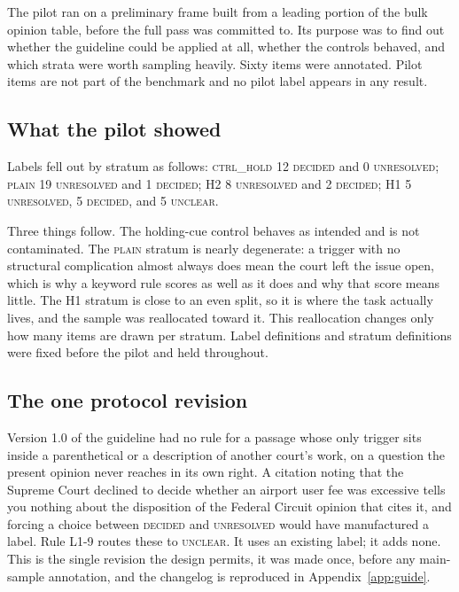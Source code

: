 The pilot ran on a preliminary frame built from a leading portion of the bulk
opinion table, before the full pass was committed to. Its purpose was to find
out whether the guideline could be applied at all, whether the controls behaved,
and which strata were worth sampling heavily. Sixty items were annotated. Pilot
items are not part of the benchmark and no pilot label appears in any result.

\subsection{What the pilot showed} Labels fell out by stratum as follows:
\textsc{ctrl\_hold} 12 \textsc{decided} and 0 \textsc{unresolved};
\textsc{plain} 19 \textsc{unresolved} and 1 \textsc{decided};
H2 8 \textsc{unresolved} and 2 \textsc{decided};
H1 5 \textsc{unresolved}, 5 \textsc{decided}, and 5 \textsc{unclear}.

Three things follow. The holding-cue control behaves as intended and is not
contaminated. The \textsc{plain} stratum is nearly degenerate: a trigger with no
structural complication almost always does mean the court left the issue open,
which is why a keyword rule scores as well as it does and why that score means
little. The H1 stratum is close to an even split, so it is where the task
actually lives, and the sample was reallocated toward it. This reallocation
changes only how many items are drawn per stratum. Label definitions and stratum
definitions were fixed before the pilot and held throughout.

\subsection{The one protocol revision} Version 1.0 of the guideline had no rule
for a passage whose only trigger sits inside a parenthetical or a description of
another court's work, on a question the present opinion never reaches in its own
right. A citation noting that the Supreme Court declined to decide whether an
airport user fee was excessive tells you nothing about the disposition of the
Federal Circuit opinion that cites it, and forcing a choice between
\textsc{decided} and \textsc{unresolved} would have manufactured a label. Rule
L1-9 routes these to \textsc{unclear}. It uses an existing label; it adds none.
This is the single revision the design permits, it was made once, before any
main-sample annotation, and the changelog is reproduced in
Appendix~\ref{app:guide}.

